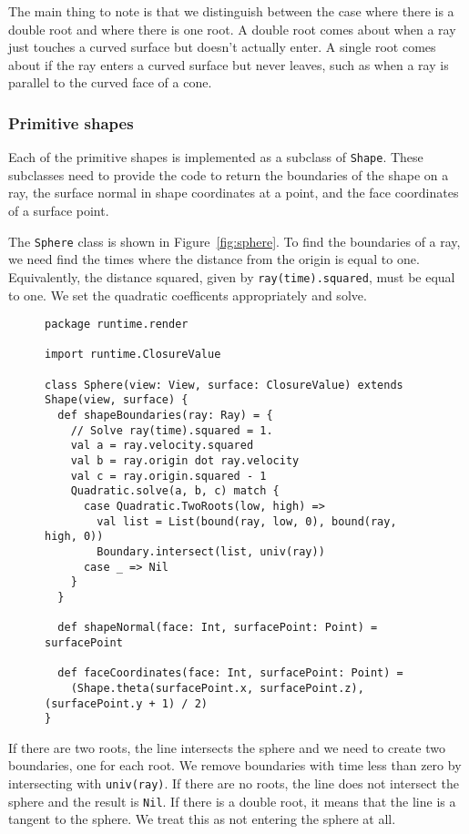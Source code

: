 The main thing to note is that we distinguish between the case where
there is a double root and where there is one root.
A double root comes about when
a ray just touches a curved surface but doesn't actually enter.
A single root comes about if the ray enters a curved surface but never leaves,
such as when a ray is parallel to the curved face of a cone.


\subsubsection{Primitive shapes\label{sec:shapes}}

Each of the primitive shapes is implemented as a subclass of \verb!Shape!.
These subclasses need to provide the code
to return the boundaries of the shape on a ray,
the surface normal in shape coordinates at a point,
and the face coordinates of a surface point.

The \verb!Sphere! class is shown in Figure~\ref{fig:sphere}.
To find the boundaries of a ray,
we need find the times where the distance from the origin is equal to one.
Equivalently,
the distance squared, given by \verb!ray(time).squared!,
must be equal to one.
We set the quadratic coefficents appropriately and solve.

\begin{figure}
\begin{verbatim}
package runtime.render

import runtime.ClosureValue

class Sphere(view: View, surface: ClosureValue) extends Shape(view, surface) {
  def shapeBoundaries(ray: Ray) = {
    // Solve ray(time).squared = 1.
    val a = ray.velocity.squared
    val b = ray.origin dot ray.velocity
    val c = ray.origin.squared - 1
    Quadratic.solve(a, b, c) match {
      case Quadratic.TwoRoots(low, high) =>
        val list = List(bound(ray, low, 0), bound(ray, high, 0))
        Boundary.intersect(list, univ(ray))
      case _ => Nil
    }
  }

  def shapeNormal(face: Int, surfacePoint: Point) = surfacePoint

  def faceCoordinates(face: Int, surfacePoint: Point) =
    (Shape.theta(surfacePoint.x, surfacePoint.z), (surfacePoint.y + 1) / 2)
}
\end{verbatim}
\getcaption
\end{figure}

If there are two roots,
the line intersects the sphere and we need to create two boundaries,
one for each root.
We remove boundaries with time less than zero by
intersecting with \verb!univ(ray)!.
If there are no roots,
the line does not intersect the sphere and the result is \verb!Nil!.
If there is a double root,
it means that the line is a tangent to the sphere.
We treat this as not entering the sphere at all.

